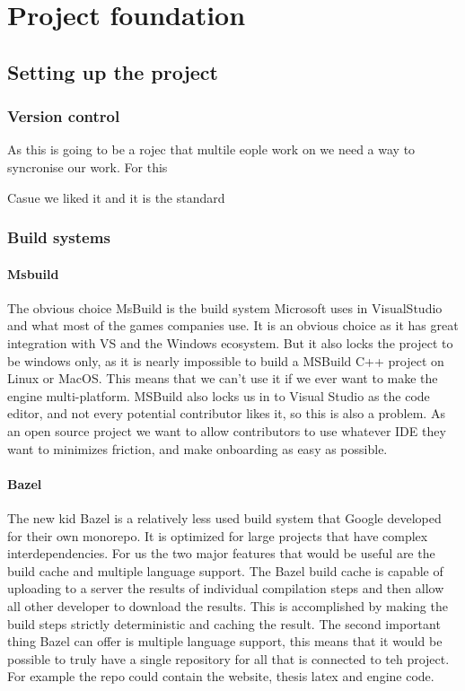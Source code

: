 \chapter{Project foundation}


\section{Setting up the project}

\subsection{Version control}

As this is going to be a rojec that multile eople work on we need a way to syncronise our work. For this

Casue we liked it and it is the standard

\subsection{Build systems}

\subsubsection{Msbuild}
The obvious choice
MsBuild is the build system Microsoft uses in VisualStudio and what most of the games companies use.
It is an obvious choice as it has great integration with VS and the Windows ecosystem.
But it also locks the project to be windows only, as it is nearly impossible to build a MSBuild C++ project on Linux or MacOS.
This means that we can't use it if we ever want to make the engine multi-platform.
MSBuild also locks us in to Visual Studio as the code editor, and not every potential contributor likes it, so this is also a problem.
As an open source project we want to allow contributors to use whatever IDE they want to minimizes friction, and make onboarding as easy as possible.

\subsubsection{Bazel}
The new kid
Bazel is a relatively less used build system that Google developed for their own monorepo.
It is optimized for large projects that have complex interdependencies.
For us the two major features that would be useful are the build cache and multiple language support.
The Bazel build cache is capable of uploading to a server the results of individual compilation steps and then allow all other developer to download the results.
This is accomplished by making the build steps strictly deterministic and caching the result.
The second important thing Bazel can offer is multiple language support,
this means that it would be possible to truly have a single repository for all that is connected to teh project.
For example the repo could contain the website, thesis latex and engine code.

